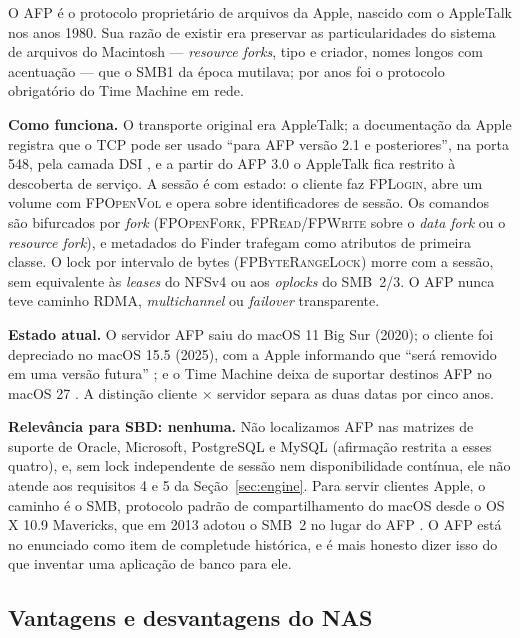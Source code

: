 \documentclass[11pt,a4paper]{article}
\begin{document}
O AFP é o protocolo proprietário de arquivos da Apple, nascido com o AppleTalk nos anos 1980. Sua razão
de existir era preservar as particularidades do sistema de arquivos do Macintosh --- \textit{resource
forks}, tipo e criador, nomes longos com acentuação --- que o SMB1 da época mutilava; por anos foi o
protocolo obrigatório do Time Machine em rede.

\textbf{Como funciona.} O transporte original era AppleTalk; a documentação da Apple registra que o TCP
pode ser usado ``para AFP versão 2.1 e posteriores'', na porta 548, pela camada DSI
\cite{appleafptcp}, e a partir do AFP 3.0 o AppleTalk fica restrito à descoberta de serviço. A sessão é
com estado: o cliente faz \textsc{FPLogin}, abre um volume com \textsc{FPOpenVol} e opera sobre
identificadores de sessão. Os comandos são bifurcados por \textit{fork} (\textsc{FPOpenFork},
\textsc{FPRead}/\textsc{FPWrite} sobre o \textit{data fork} ou o \textit{resource fork}), e metadados do
Finder trafegam como atributos de primeira classe. O lock por intervalo de bytes
(\textsc{FPByteRangeLock}) morre com a sessão, sem equivalente às \textit{leases} do NFSv4 ou aos
\textit{oplocks} do SMB~2/3. O AFP nunca teve caminho RDMA, \textit{multichannel} ou
\textit{failover} transparente.

\textbf{Estado atual.} O servidor AFP saiu do macOS 11 Big Sur (2020); o cliente foi depreciado no
macOS 15.5 (2025), com a Apple informando que ``será removido em uma versão futura'' \cite{appleafp};
e o Time Machine deixa de suportar destinos AFP no macOS 27 \cite{appleafptm}. A distinção cliente ×
servidor separa as duas datas por cinco anos.

\textbf{Relevância para SBD: nenhuma.} Não localizamos AFP nas matrizes de suporte de Oracle, Microsoft,
PostgreSQL e MySQL (afirmação restrita a esses quatro), e, sem lock independente de sessão nem
disponibilidade contínua, ele não atende aos requisitos 4 e 5 da Seção~\ref{sec:engine}. Para servir
clientes Apple, o caminho é o SMB, protocolo padrão de compartilhamento do macOS desde o OS X 10.9
Mavericks, que em 2013 adotou o SMB~2 no lugar do AFP \cite{appleinsider2013}. O AFP está no enunciado
como item de completude histórica, e é mais honesto dizer isso do que inventar uma aplicação de banco
para ele.

\subsection{Vantagens e desvantagens do NAS}
\label{sec:vantnas}
\end{document}
